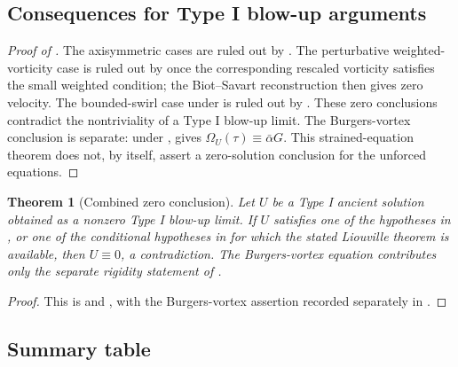 \documentclass[11pt]{amsart}
\theoremstyle{plain}
\newtheorem{theorem}{Theorem}[section]
\theoremstyle{definition}
\theoremstyle{remark}
\numberwithin{equation}{section}
\begin{document}
\subsection{Consequences for Type I blow-up arguments}

\begin{proof}[Proof of ]
The axisymmetric cases are ruled out by .  The
perturbative weighted-vorticity case is ruled out by
 once the corresponding rescaled
vorticity satisfies the small weighted condition; the Biot--Savart
reconstruction then gives zero velocity.  The bounded-swirl case under
 is ruled out by .  These zero
conclusions contradict the nontriviality of a Type I blow-up limit.  The
Burgers-vortex conclusion is separate: under ,
 gives \(\Omega_U(\tau)\equiv\bar\alpha G\).  This
strained-equation theorem does not, by itself, assert a zero-solution
conclusion for the unforced equations.
\end{proof}

\begin{theorem}[Combined zero conclusion]
\label{thm:stated-hypotheses-zero}
Let \(U\) be a Type I ancient solution obtained as a nonzero Type I blow-up
limit.  If \(U\) satisfies one of the hypotheses in
, or one of the conditional hypotheses in
 for which the stated Liouville theorem is
available, then \(U\equiv0\), a contradiction.  The Burgers-vortex equation
contributes only the separate rigidity statement of
.
\end{theorem}

\begin{proof}
This is  and
, with the Burgers-vortex assertion recorded
separately in .
\end{proof}

\subsection{Summary table}
\end{document}
